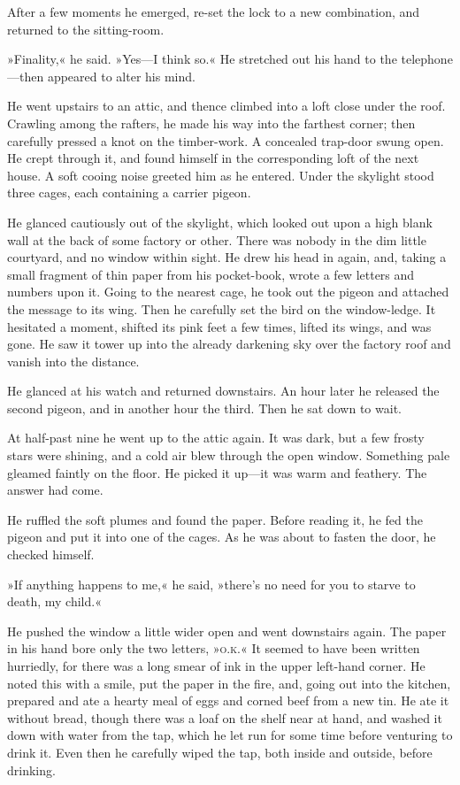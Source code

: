After a few moments he emerged, re-set the lock to a new combination, and returned to the sitting-room.

»Finality,« he said. »Yes—I think so.« He stretched out his hand to the telephone—then appeared to alter his mind.

He went upstairs to an attic, and thence climbed into a loft close under the roof. Crawling among the rafters, he made his way into the farthest corner; then carefully pressed a knot on the timber-work. A concealed trap-door swung open. He crept through it, and found himself in the corresponding loft of the next house. A soft cooing noise greeted him as he entered. Under the skylight stood three cages, each containing a carrier pigeon.

He glanced cautiously out of the skylight, which looked out upon a high blank wall at the back of some factory or other. There was nobody in the dim little courtyard, and no window within sight. He drew his head in again, and, taking a small fragment of thin paper from his pocket-book, wrote a few letters and numbers upon it. Going to the nearest cage, he took out the pigeon and attached the message to its wing. Then he carefully set the bird on the window-ledge. It hesitated a moment, shifted its pink feet a few times, lifted its wings, and was gone. He saw it tower up into the already darkening sky over the factory roof and vanish into the distance.

He glanced at his watch and returned downstairs. An hour later he released the second pigeon, and in another hour the third. Then he sat down to wait.

At half-past nine he went up to the attic again. It was dark, but a few frosty stars were shining, and a cold air blew through the open window. Something pale gleamed faintly on the floor. He picked it up—it was warm and feathery. The answer had come.

He ruffled the soft plumes and found the paper. Before reading it, he fed the pigeon and put it into one of the cages. As he was about to fasten the door, he checked himself.

»If anything happens to me,« he said, »there's no need for you to starve to death, my child.«

He pushed the window a little wider open and went downstairs again. The paper in his hand bore only the two letters, »\textsc{o.k.}« It seemed to have been written hurriedly, for there was a long smear of ink in the upper left-hand corner. He noted this with a smile, put the paper in the fire, and, going out into the kitchen, prepared and ate a hearty meal of eggs and corned beef from a new tin. He ate it without bread, though there was a loaf on the shelf near at hand, and washed it down with water from the tap, which he let run for some time before venturing to drink it. Even then he carefully wiped the tap, both inside and outside, before drinking.

